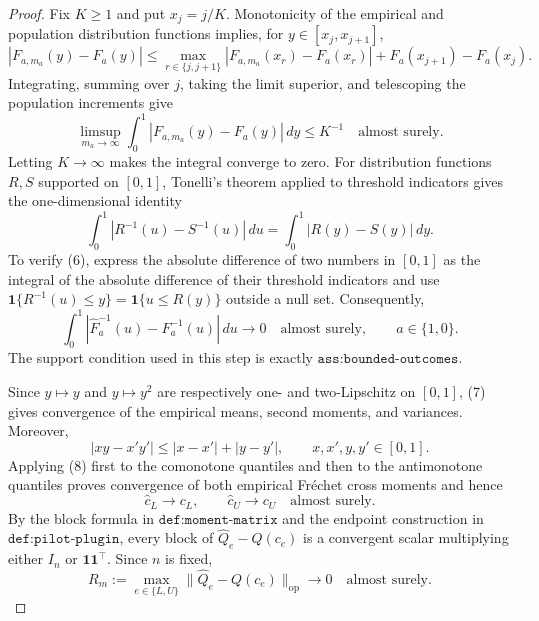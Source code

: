 \documentclass{article}
\begin{document}
\begin{proof}
Fix \(K\ge1\) and put \(x_j=j/K\).  Monotonicity of the empirical and population distribution functions implies, for \(y\in[x_j,x_{j+1}]\),
\[
|F_{a,m_a}(y)-F_a(y)|
\le
\max_{r\in\{j,j+1\}}|F_{a,m_a}(x_r)-F_a(x_r)|
+F_a(x_{j+1})-F_a(x_j).
\tag{4}
\]
Integrating, summing over \(j\), taking the limit superior, and telescoping the population increments give
\[
\limsup_{m_a\to\infty}
\int_0^1|F_{a,m_a}(y)-F_a(y)|\,dy\le K^{-1}
\quad\text{almost surely}.
\tag{5}
\]
Letting \(K\to\infty\) makes the integral converge to zero.  For distribution functions \(R,S\) supported on \([0,1]\), Tonelli's theorem applied to threshold indicators gives the one-dimensional identity
\[
\int_0^1|R^{-1}(u)-S^{-1}(u)|\,du
=\int_0^1|R(y)-S(y)|\,dy.
\tag{6}
\]
To verify (6), express the absolute difference of two numbers in \([0,1]\) as the integral of the absolute difference of their threshold indicators and use
\(\mathbf 1\{R^{-1}(u)\le y\}=\mathbf 1\{u\le R(y)\}\) outside a null set.  Consequently,
\[
\int_0^1|\widehat F_a^{-1}(u)-F_a^{-1}(u)|\,du\longrightarrow0
\quad\text{almost surely},
\qquad a\in\{1,0\}.
\tag{7}
\]
The support condition used in this step is exactly \(\texttt{ass:bounded-outcomes}\).

Since \(y\mapsto y\) and \(y\mapsto y^2\) are respectively one- and two-Lipschitz on \([0,1]\), (7) gives convergence of the empirical means, second moments, and variances.  Moreover,
\[
|xy-x'y'|\le |x-x'|+|y-y'|,
\qquad x,x',y,y'\in[0,1].
\tag{8}
\]
Applying (8) first to the comonotone quantiles and then to the antimonotone quantiles proves convergence of both empirical Fr\'echet cross moments and hence
\[
\widehat c_L\to c_L,
\qquad
\widehat c_U\to c_U
\quad\text{almost surely}.
\tag{9}
\]
By the block formula in \(\texttt{def:moment-matrix}\) and the endpoint construction in \(\texttt{def:pilot-plugin}\), every block of \(\widehat Q_e-Q(c_e)\) is a convergent scalar multiplying either \(I_n\) or \(\mathbf 1\mathbf 1^{\top}\).  Since \(n\) is fixed,
\[
R_m:=\max_{e\in\{L,U\}}
\lVert\widehat Q_e-Q(c_e)\rVert_{\mathrm{op}}\longrightarrow0
\quad\text{almost surely}.
\tag{10}
\]


\end{proof}
\end{document}
